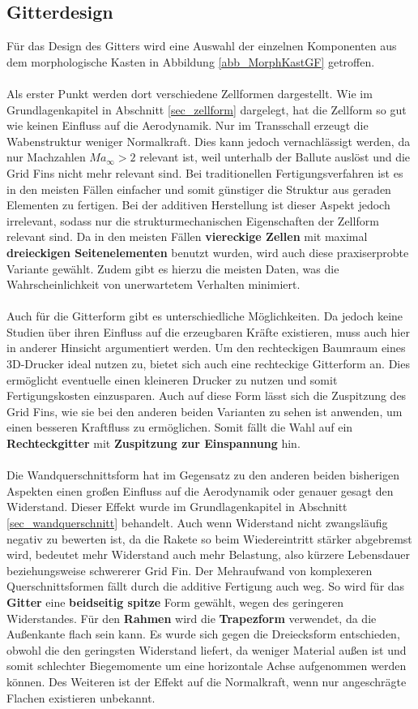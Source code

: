 \subsection{Gitterdesign}
Für das Design des Gitters wird eine Auswahl der einzelnen Komponenten aus dem morphologische Kasten in Abbildung \ref{abb_MorphKastGF} getroffen.
\\~\\
Als erster Punkt werden dort verschiedene Zellformen dargestellt. Wie im Grundlagenkapitel in Abschnitt \ref{sec_zellform} dargelegt, hat die Zellform so gut wie keinen Einfluss auf die Aerodynamik. Nur im Transschall erzeugt die Wabenstruktur weniger Normalkraft. Dies kann jedoch vernachlässigt werden, da nur Machzahlen $Ma_\infty >2$ relevant ist, weil unterhalb der Ballute auslöst und die Grid Fins nicht mehr relevant sind. Bei traditionellen Fertigungsverfahren ist es in den meisten Fällen einfacher und somit günstiger die Struktur aus geraden Elementen zu fertigen. Bei der additiven Herstellung ist dieser Aspekt jedoch irrelevant, sodass nur die strukturmechanischen Eigenschaften der Zellform relevant sind. Da in den meisten Fällen \textbf{viereckige Zellen} mit maximal \textbf{dreieckigen Seitenelementen} benutzt wurden, wird auch diese praxiserprobte Variante gewählt. Zudem gibt es hierzu die meisten Daten, was die Wahrscheinlichkeit von unerwartetem Verhalten minimiert.
\\~\\
Auch für die Gitterform gibt es unterschiedliche Möglichkeiten. Da jedoch keine Studien über ihren Einfluss auf die erzeugbaren Kräfte existieren, muss auch hier in anderer Hinsicht argumentiert werden. Um den rechteckigen Baumraum eines 3D-Drucker ideal nutzen zu, bietet sich auch eine rechteckige Gitterform an. Dies ermöglicht eventuelle einen kleineren Drucker zu nutzen und somit Fertigungskosten einzusparen. Auch auf diese Form lässt sich die Zuspitzung des Grid Fins, wie sie bei den anderen beiden Varianten zu sehen ist anwenden, um einen besseren Kraftfluss zu ermöglichen. Somit fällt die Wahl auf ein \textbf{Rechteckgitter} mit \textbf{Zuspitzung zur Einspannung} hin.
\\~\\
Die Wandquerschnittsform hat im Gegensatz zu den anderen beiden bisherigen Aspekten einen großen Einfluss auf die Aerodynamik oder genauer gesagt den Widerstand. Dieser Effekt wurde im Grundlagenkapitel in Abschnitt \ref{sec_wandquerschnitt} behandelt. Auch wenn Widerstand nicht zwangsläufig negativ zu bewerten ist, da die Rakete so beim Wiedereintritt stärker abgebremst wird, bedeutet mehr Widerstand auch mehr Belastung, also kürzere Lebensdauer beziehungsweise schwererer Grid Fin. Der Mehraufwand von komplexeren Querschnittsformen fällt durch die additive Fertigung auch weg. So wird für das \textbf{Gitter} eine \textbf{beidseitig spitze} Form gewählt, wegen des geringeren Widerstandes. Für den \textbf{Rahmen} wird die \textbf{Trapezform} verwendet, da die Außenkante flach sein kann. Es wurde sich gegen die Dreiecksform entschieden, obwohl die den geringsten Widerstand liefert, da weniger Material außen ist und somit schlechter Biegemomente um eine horizontale Achse aufgenommen werden können. Des Weiteren ist der Effekt auf die Normalkraft, wenn nur angeschrägte Flachen existieren unbekannt.
